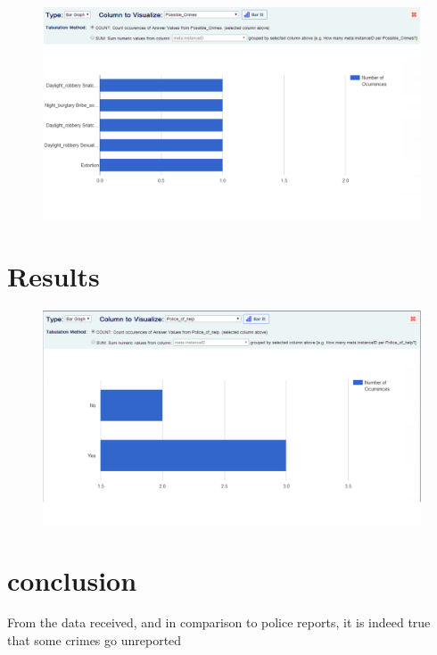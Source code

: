 \documentclass{article}
\begin{document}
\begin{figure}[h!]
\centering
\includegraphics[width=1\textwidth]{Screenshot 4.png}
\end{figure}
\section{Results}
\begin{figure}[h!]
\centering
\includegraphics[width=1\textwidth]{Screenshot 5.png}
\end{figure}


\section{conclusion}

From the data received, and in comparison to police reports, it is indeed true that some crimes go unreported
\end{document}
